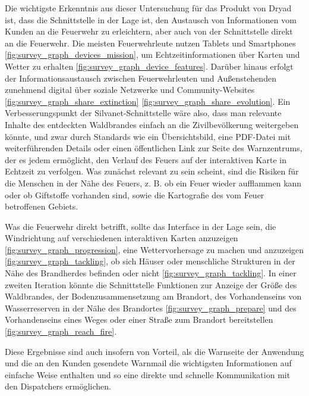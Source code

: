 Die wichtigste Erkenntnis aus dieser Untersuchung für das Produkt von Dryad ist, dass die Schnittstelle in der Lage ist, den Austausch von Informationen vom Kunden an die Feuerwehr zu erleichtern, aber auch von der Schnittstelle direkt an die Feuerwehr.
Die meisten Feuerwehrleute nutzen Tablets und Smartphones \ref{fig:survey_graph_devices_mission}, um Echtzeitinformationen über Karten und Wetter zu erhalten \ref{fig:survey_graph_device_features}.
Darüber hinaus erfolgt der Informationsaustausch zwischen Feuerwehrleuten und Außenstehenden zunehmend digital über soziale Netzwerke und Community-Websites \ref{fig:survey_graph_share_extinction} \ref{fig:survey_graph_share_evolution}.
Ein Verbesserungspunkt der Silvanet-Schnittstelle wäre also, dass man relevante Inhalte des entdeckten Waldbrandes einfach an die Zivilbevölkerung weitergeben könnte, und zwar durch Standards wie ein Übersichtsbild, eine PDF-Datei mit weiterführenden Details oder einen öffentlichen Link zur Seite des Warnzentrums, der es jedem ermöglicht, den Verlauf des Feuers auf der interaktiven Karte in Echtzeit zu verfolgen.
Was zunächst relevant zu sein scheint, sind die Risiken für die Menschen in der Nähe des Feuers, z. B. ob ein Feuer wieder aufflammen kann oder ob Giftstoffe vorhanden sind, sowie die Kartografie des vom Feuer betroffenen Gebiets.

Was die Feuerwehr direkt betrifft, sollte das Interface in der Lage sein, die Windrichtung auf verschiedenen interaktiven Karten anzuzeigen \ref{fig:survey_graph_progression}, eine Wettervorhersage zu machen und anzuzeigen \ref{fig:survey_graph_tackling}, ob sich Häuser oder menschliche Strukturen in der Nähe des Brandherdes befinden oder nicht \ref{fig:survey_graph_tackling}.
In einer zweiten Iteration könnte die Schnittstelle Funktionen zur Anzeige der Größe des Waldbrandes, der Bodenzusammensetzung am Brandort, des Vorhandenseins von Wasserreserven in der Nähe des Brandortes \ref{fig:survey_graph_prepare} und des Vorhandenseins eines Weges oder einer Straße zum Brandort bereitstellen \ref{fig:survey_graph_reach_fire}.

Diese Ergebnisse sind auch insofern von Vorteil, als die Warnseite der Anwendung und die an den Kunden gesendete Warnmail die wichtigsten Informationen auf einfache Weise enthalten und so eine direkte und schnelle Kommunikation mit den Dispatchers ermöglichen.